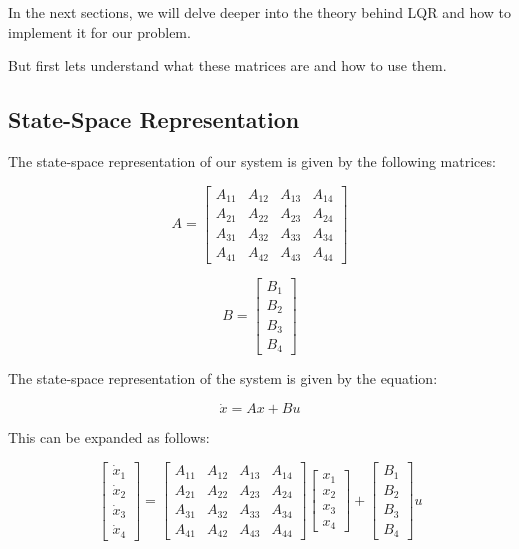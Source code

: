\documentclass[11pt,twocolumn,twoside,lineno]{pnas-new}
\begin{document}
In the next sections, we will delve deeper into the theory behind LQR and how to implement it for our problem.

But first lets understand what these matrices are and how to use them.

\subsection{State-Space Representation}
The state-space representation of our system is given by the following matrices:

\begin{equation}
A = \begin{bmatrix}
A_{11} & A_{12} & A_{13} & A_{14} \\
A_{21} & A_{22} & A_{23} & A_{24} \\
A_{31} & A_{32} & A_{33} & A_{34} \\
A_{41} & A_{42} & A_{43} & A_{44}
\end{bmatrix}
\end{equation}

\begin{equation}
B = \begin{bmatrix}
B_{1} \\
B_{2} \\
B_{3} \\
B_{4}
\end{bmatrix}
\end{equation}

The state-space representation of the system is given by the equation:

\begin{equation}
\dot{x} = Ax + Bu
\end{equation}

This can be expanded as follows:

\begin{equation}
\begin{bmatrix}
\dot{x}_1 \\
\dot{x}_2 \\
\dot{x}_3 \\
\dot{x}_4
\end{bmatrix}
=
\begin{bmatrix}
A_{11} & A_{12} & A_{13} & A_{14} \\
A_{21} & A_{22} & A_{23} & A_{24} \\
A_{31} & A_{32} & A_{33} & A_{34} \\
A_{41} & A_{42} & A_{43} & A_{44}
\end{bmatrix}
\begin{bmatrix}
x_1 \\
x_2 \\
x_3 \\
x_4
\end{bmatrix}
+
\begin{bmatrix}
B_{1} \\
B_{2} \\
B_{3} \\
B_{4}
\end{bmatrix}
u
\end{equation}
\end{document}
